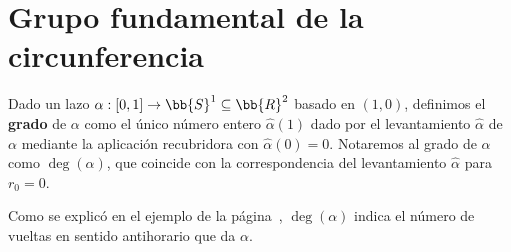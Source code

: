 \section{Grupo fundamental de la circunferencia}

\begin{definicion}
    Dado un lazo $\alpha:[0,1]\to \bb{S}^1 \subseteq \bb{R}^2$ basado en $(1,0)$, definimos el \textbf{grado} de $\alpha$ como el único número entero $\hat{\alpha}(1)$ dado por el levantamiento $\hat{\alpha}$ de $\alpha$ mediante la aplicación recubridora
    con $\hat{\alpha}(0) = 0$. Notaremos al grado de $\alpha$ como $\deg(\alpha)$, que coincide con la correspondencia del levantamiento $\hat{\alpha}$ para $r_0=0$.
\end{definicion}

Como se explicó en el ejemplo de la página~\pageref{ejemplo:correspondencia_levantamiento}, $\deg(\alpha)$ indica el número de vueltas en sentido antihorario que da $\alpha$.

